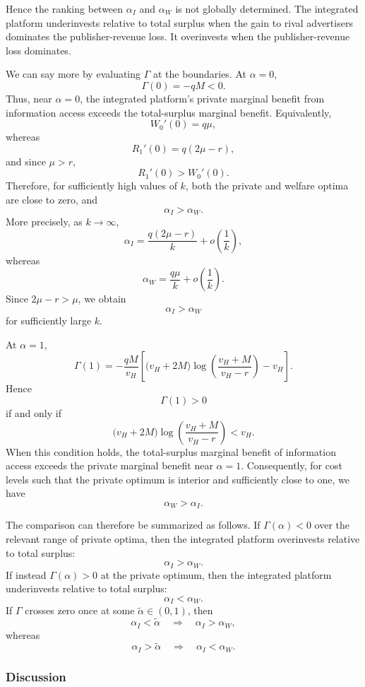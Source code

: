 \documentclass[11pt]{article}
\theoremstyle{plain}
\theoremstyle{definition}
\theoremstyle{plain}
\theoremstyle{plain}
\theoremstyle{plain}
\theoremstyle{plain}
\numberwithin{equation}{section}
\begin{document}
Hence the ranking between $\alpha_I$ and $\alpha_W$ is not globally determined. The
integrated platform underinvests relative to total surplus when the gain to rival advertisers
dominates the publisher-revenue loss. It overinvests when the publisher-revenue loss dominates.

We can say more by evaluating $\Gamma$ at the boundaries. At $\alpha=0$,
\[
\Gamma(0)=-qM<0.
\]
Thus, near $\alpha=0$, the integrated platform's private marginal benefit from information
access exceeds the total-surplus marginal benefit. Equivalently,
\[
W_0'(0)=q\mu,
\]
whereas
\[
R_1'(0)=q(2\mu-r),
\]
and since $\mu>r$,
\[
R_1'(0)>W_0'(0).
\]
Therefore, for sufficiently high values of $k$, both the private and welfare optima are close to
zero, and
\[
\alpha_I>\alpha_W.
\]
More precisely, as $k\to\infty$,
\[
\alpha_I
=
\frac{q(2\mu-r)}{k}
+
o\left(\frac{1}{k}\right),
\]
whereas
\[
\alpha_W
=
\frac{q\mu}{k}
+
o\left(\frac{1}{k}\right).
\]
Since $2\mu-r>\mu$, we obtain
\[
\alpha_I>\alpha_W
\]
for sufficiently large $k$.

At $\alpha=1$,
\[
\Gamma(1)
=
-\frac{qM}{v_H}
\left[
\big(v_H+2M\big)
\log\left(
\frac{v_H+M}{v_H-r}
\right)
-v_H
\right].
\]
Hence
\[
\Gamma(1)>0
\]
if and only if
\[
\big(v_H+2M\big)
\log\left(
\frac{v_H+M}{v_H-r}
\right)
<
v_H.
\]
When this condition holds, the total-surplus marginal benefit of information access exceeds
the private marginal benefit near $\alpha=1$. Consequently, for cost levels such that the private
optimum is interior and sufficiently close to one, we have
\[
\alpha_W>\alpha_I.
\]

The comparison can therefore be summarized as follows. If $\Gamma(\alpha)<0$ over the relevant
range of private optima, then the integrated platform overinvests relative to total surplus:
\[
\alpha_I>\alpha_W.
\]
If instead $\Gamma(\alpha)>0$ at the private optimum, then the integrated platform underinvests
relative to total surplus:
\[
\alpha_I<\alpha_W.
\]
If $\Gamma$ crosses zero once at some $\tilde\alpha\in(0,1)$, then
\[
\alpha_I<\tilde\alpha
\quad\Longrightarrow\quad
\alpha_I>\alpha_W,
\]
whereas
\[
\alpha_I>\tilde\alpha
\quad\Longrightarrow\quad
\alpha_I<\alpha_W.
\]

\subsubsection{Discussion}
\end{document}
